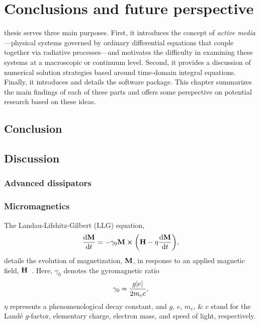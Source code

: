 \chapter{\label{ch:conclusions}Conclusions and future perspective}

 thesis serves three main purposes.
First, it introduces the concept of \emph{active media}---physical systems governed by ordinary differential equations that couple together via radiative processes---and motivates the difficulty in examining these systems at a macroscopic or continuum level.
Second, it provides a discussion of numerical solution strategies based around time-domain integral equations.
Finally, it introduces and details the \QuEST{} software package.
This chapter summarizes the main findings of each of these parts and offers some perspective on potential research based on these ideas.

\section{Conclusion}


\section{Discussion}

\subsection{Advanced dissipators}

\subsection{Micromagnetics}

The Landau-Lifshitz-Gilbert (LLG) equation,
\begin{equation}
  \dv{\vb{M}}{t} = -\gamma_0 \vb{M} \cp \qty(\vb{H} - \eta \dv{\vb{M}}{t}),
  \label{eq:llg}
\end{equation}
details the evolution of magnetization, $\vb{M}$, in response to an applied magnetic field, $\vb{H}$~\cite{Aharoni2000}.
Here, $\gamma_0$ denotes the gyromagnetic ratio
\begin{equation}
  \gamma_0 = \frac{g \abs{e}}{2 m_e c},
  \label{eq:gyro}
\end{equation}
$\eta$ represents a phenomenological decay constant, and $g$, $e$, $m_e$, \& $c$ stand for the Land\'e $g$-factor, elementary charge, electron mass, and speed of light, respectively.

